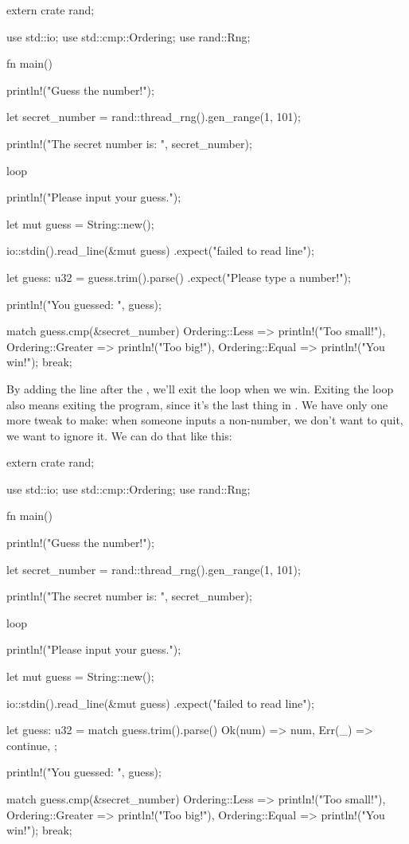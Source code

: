 \begin{rustc}
extern crate rand;

use std::io;
use std::cmp::Ordering;
use rand::Rng;

fn main() {
    println!("Guess the number!");

    let secret_number = rand::thread_rng().gen_range(1, 101);

    println!("The secret number is: {}", secret_number);

    loop {
        println!("Please input your guess.");

        let mut guess = String::new();

        io::stdin().read_line(&mut guess)
            .expect("failed to read line");

        let guess: u32 = guess.trim().parse()
            .expect("Please type a number!");

        println!("You guessed: {}", guess);

        match guess.cmp(&secret_number) {
            Ordering::Less    => println!("Too small!"),
            Ordering::Greater => println!("Too big!"),
            Ordering::Equal   => {
                println!("You win!");
                break;
            }
        }
    }
}
\end{rustc}

By adding the  line after the , we’ll exit the loop when we win. Exiting the loop also means exiting 
the program, since it’s the last thing in . We have only one more tweak to make: when someone inputs a non-number, 
we don’t want to quit, we want to ignore it. We can do that like this:

\begin{rustc}
extern crate rand;

use std::io;
use std::cmp::Ordering;
use rand::Rng;

fn main() {
    println!("Guess the number!");

    let secret_number = rand::thread_rng().gen_range(1, 101);

    println!("The secret number is: {}", secret_number);

    loop {
        println!("Please input your guess.");

        let mut guess = String::new();

        io::stdin().read_line(&mut guess)
            .expect("failed to read line");

        let guess: u32 = match guess.trim().parse() {
            Ok(num) => num,
            Err(_) => continue,
        };

        println!("You guessed: {}", guess);

        match guess.cmp(&secret_number) {
            Ordering::Less    => println!("Too small!"),
            Ordering::Greater => println!("Too big!"),
            Ordering::Equal   => {
                println!("You win!");
                break;
            }
        }
    }
}
\end{rustc}

